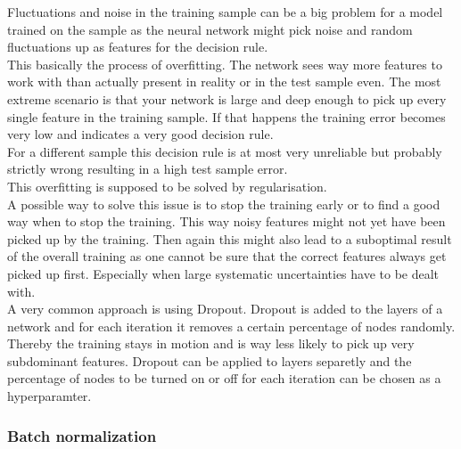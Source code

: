 Fluctuations and noise in the training sample can be a big problem for a model trained on the sample as the neural network might pick noise and random fluctuations up as features for the decision rule.\\
This basically the process of overfitting. The network sees way more features to work with than actually present in reality or in the test sample even. The most extreme scenario is that your network is large and deep enough to pick up every single feature in the training sample. If that happens the training error becomes very low and indicates a very good decision rule.\\
For a different sample this decision rule is at most very unreliable but probably strictly wrong resulting in a high test sample error.\\
This overfitting is supposed to be solved by regularisation.\\
A possible way to solve this issue is to stop the training early or to find a good way when to stop the training. This way noisy features might not yet have been picked up by the training. Then again this might also lead to a suboptimal result of the overall training as one cannot be sure that the correct features always get picked up first. Especially when large systematic uncertainties have to be dealt with.\\
A very common approach is using Dropout. Dropout is added to the layers of a network and for each iteration it removes a certain percentage of nodes randomly. Thereby the training stays in motion and is way less likely to pick up very subdominant features. Dropout can be applied to layers separetly and the percentage of nodes to be turned on or off for each iteration can be chosen as a hyperparamter.



\subsubsection{Batch normalization}


